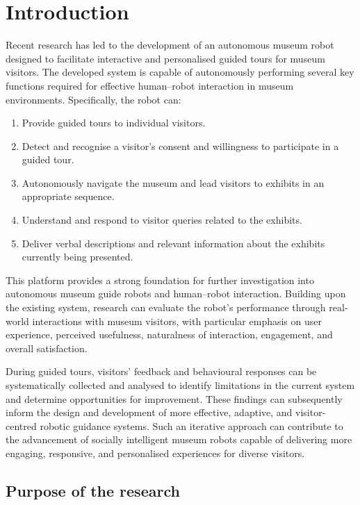 \section{Introduction}

Recent research has led to the development of an autonomous museum robot designed to facilitate interactive and personalised guided tours for museum visitors. The developed system is capable of autonomously performing several key functions required for effective human–robot interaction in museum environments. Specifically, the robot can:

\begin{enumerate}
    \item Provide guided tours to individual visitors.
    \item Detect and recognise a visitor’s consent and willingness to participate in a guided tour.
    \item Autonomously navigate the museum and lead visitors to exhibits in an appropriate sequence.
    \item Understand and respond to visitor queries related to the exhibits.
    \item Deliver verbal descriptions and relevant information about the exhibits currently being presented.
\end{enumerate}
This platform provides a strong foundation for further investigation into autonomous museum guide robots and human–robot interaction. Building upon the existing system, research can evaluate the robot’s performance through real-world interactions with museum visitors, with particular emphasis on user experience, perceived usefulness, naturalness of interaction, engagement, and overall satisfaction.

During guided tours, visitors’ feedback and behavioural responses can be systematically collected and analysed to identify limitations in the current system and determine opportunities for improvement. These findings can subsequently inform the design and development of more effective, adaptive, and visitor-centred robotic guidance systems. Such an iterative approach can contribute to the advancement of socially intelligent museum robots capable of delivering more engaging, responsive, and personalised experiences for diverse visitors.


\subsection{Purpose of the research}

